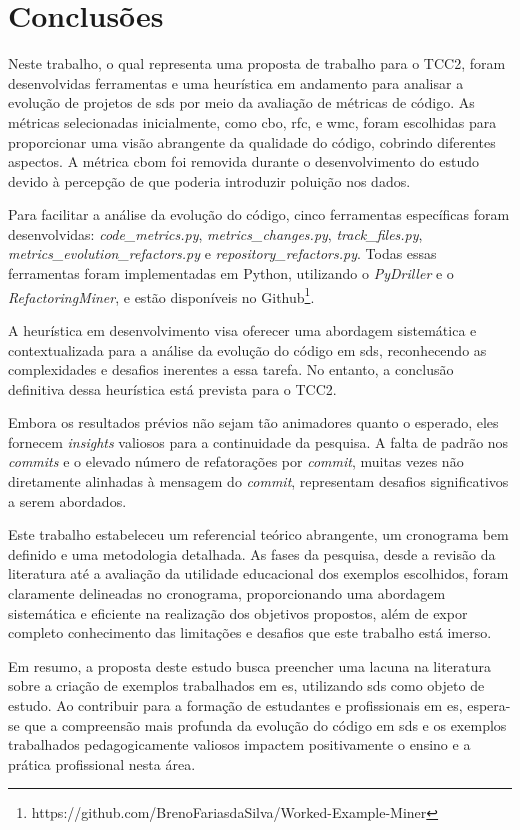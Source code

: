 
\chapter{Conclusões}
\label{cap:conclusoes}

Neste trabalho, o qual representa uma proposta de trabalho para o TCC2, foram desenvolvidas ferramentas e uma heurística em andamento para analisar a evolução de projetos de \gls{sds} por meio da avaliação de métricas de código. As métricas selecionadas inicialmente, como \gls{cbo}, \gls{rfc}, e \gls{wmc}, foram escolhidas para proporcionar uma visão abrangente da qualidade do código, cobrindo diferentes aspectos. A métrica \gls{cbom} foi removida durante o desenvolvimento do estudo devido à percepção de que poderia introduzir poluição nos dados.

Para facilitar a análise da evolução do código, cinco ferramentas específicas foram desenvolvidas: \textit{code\_metrics.py}, \textit{metrics\_changes.py}, \textit{track\_files.py}, \textit{metrics\_evolution\_refactors.py} e \textit{repository\_refactors.py}. Todas essas ferramentas foram implementadas em Python, utilizando o \textit{PyDriller} e o \textit{RefactoringMiner}, e estão disponíveis no Github\footnote{https://github.com/BrenoFariasdaSilva/Worked-Example-Miner}.

A heurística em desenvolvimento visa oferecer uma abordagem sistemática e contextualizada para a análise da evolução do código em \gls{sds}, reconhecendo as complexidades e desafios inerentes a essa tarefa. No entanto, a conclusão definitiva dessa heurística está prevista para o TCC2.

Embora os resultados prévios não sejam tão animadores quanto o esperado, eles fornecem \textit{insights} valiosos para a continuidade da pesquisa. A falta de padrão nos \textit{commits} e o elevado número de refatorações por \textit{commit}, muitas vezes não diretamente alinhadas à mensagem do \textit{commit}, representam desafios significativos a serem abordados.

Este trabalho estabeleceu um referencial teórico abrangente, um cronograma bem definido e uma metodologia detalhada. As fases da pesquisa, desde a revisão da literatura até a avaliação da utilidade educacional dos exemplos escolhidos, foram claramente delineadas no cronograma, proporcionando uma abordagem sistemática e eficiente na realização dos objetivos propostos, além de expor completo conhecimento das limitações e desafios que este trabalho está imerso.

Em resumo, a proposta deste estudo busca preencher uma lacuna na literatura sobre a criação de exemplos trabalhados em \gls{es}, utilizando \gls{sds} como objeto de estudo. Ao contribuir para a formação de estudantes e profissionais em \gls{es}, espera-se que a compreensão mais profunda da evolução do código em \gls{sds} e os exemplos trabalhados pedagogicamente valiosos impactem positivamente o ensino e a prática profissional nesta área.